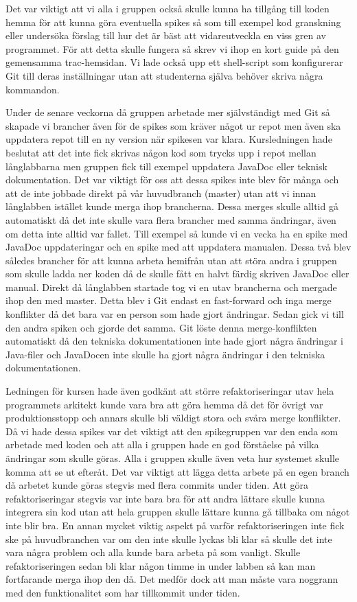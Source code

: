 Det var viktigt att vi alla i gruppen också skulle kunna ha tillgång till koden hemma för att kunna göra eventuella spikes så som till exempel kod granskning eller undersöka förslag till hur det är bäst att vidareutveckla en viss gren av programmet. För att detta skulle fungera så skrev vi ihop en kort guide på den gemensamma trac-hemsidan. Vi lade också upp ett shell-script som konfigurerar Git till deras inställningar utan att studenterna själva behöver skriva några kommandon.

Under de senare veckorna då gruppen arbetade mer självständigt med Git så skapade vi brancher även för de spikes som kräver något ur repot men även ska uppdatera repot till en ny version när spikesen var klara. Kursledningen hade beslutat att det inte fick skrivas någon kod som trycks upp i repot mellan långlabbarna men gruppen fick till exempel uppdatera JavaDoc eller teknisk dokumentation. Det var viktigt för oss att dessa spikes inte blev för många och att de inte jobbade direkt på vår huvudbranch (master) utan att vi innan långlabben istället kunde merga ihop brancherna. Dessa merges skulle alltid gå automatiskt då det inte skulle vara flera brancher med samma ändringar, även om detta inte alltid var fallet. Till exempel så kunde vi en vecka ha en spike med JavaDoc uppdateringar och en spike med att uppdatera manualen. Dessa två blev således brancher för att kunna arbeta hemifrån utan att störa andra i gruppen som skulle ladda ner koden då de skulle fått en halvt färdig skriven JavaDoc eller manual. Direkt då långlabben startade tog vi en utav brancherna och mergade ihop den med master. Detta blev i Git endast en fast-forward och inga merge konflikter då det bara var en person som hade gjort ändringar. Sedan gick vi till den andra spiken och gjorde det samma. Git löste denna merge-konflikten automatiskt då den tekniska dokumentationen inte hade gjort några ändringar i Java-filer och JavaDocen inte skulle ha gjort några ändringar i den tekniska dokumentationen.

Ledningen för kursen hade även godkänt att större refaktoriseringar utav hela programmets arkitekt kunde vara bra att göra hemma då det för övrigt var produktionsstopp och annars skulle bli väldigt stora och svåra merge konflikter. Då vi hade dessa spikes var det viktigt att den spikegruppen var den enda som arbetade med koden och att alla i gruppen hade en god förståelse på vilka ändringar som skulle göras. Alla i gruppen skulle även veta hur systemet skulle komma att se ut efteråt. Det var viktigt att lägga detta arbete på en egen branch då arbetet kunde göras stegvis med flera commits under tiden. Att göra refaktoriseringar stegvis var inte bara bra för att andra lättare skulle kunna integrera sin kod utan att hela gruppen skulle lättare kunna gå tillbaka om något inte blir bra. En annan mycket viktig aspekt på varför refaktoriseringen inte fick ske på huvudbranchen var om den inte skulle lyckas bli klar så skulle det inte vara några problem och alla kunde bara arbeta på som vanligt. Skulle refaktoriseringen sedan bli klar någon timme in under labben så kan man fortfarande merga ihop den då. Det medför dock att man måste vara noggrann med den funktionalitet som har tillkommit under tiden.

